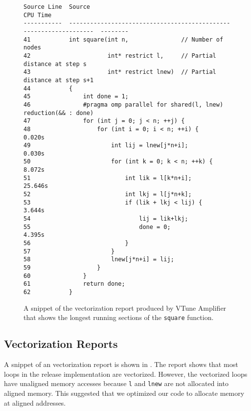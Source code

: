 \begin{figure}[h]
{
\scriptsize
\begin{BVerbatim}
Source Line  Source                                                              CPU Time
-----------  ------------------------------------------------------------------  --------
41           int square(int n,               // Number of nodes
42                      int* restrict l,     // Partial distance at step s
43                      int* restrict lnew)  // Partial distance at step s+1
44           {
45               int done = 1;
46               #pragma omp parallel for shared(l, lnew) reduction(&& : done)
47               for (int j = 0; j < n; ++j) {
48                   for (int i = 0; i < n; ++i) {                                 0.020s
49                       int lij = lnew[j*n+i];                                    0.030s
50                       for (int k = 0; k < n; ++k) {                             8.072s
51                           int lik = l[k*n+i];                                  25.646s
52                           int lkj = l[j*n+k];
53                           if (lik + lkj < lij) {                                3.644s
54                               lij = lik+lkj;
55                               done = 0;                                         4.395s
56                           }
57                       }
58                       lnew[j*n+i] = lij;
59                   }
60               }
61               return done;
62           }
\end{BVerbatim}
}
\caption{%
  A snippet of the vectorization report produced by VTune Amplifier that shows
  the longest running sections of the \texttt{square} function.
}
\label{fig:vtune-b}
\end{figure}

\subsection{Vectorization Reports}
A snippet of an \icc{} vectorization report is shown in
. The report shows that most loops in the release
implementation are vectorized. However, the vectorized loops have unaligned
memory accesses because \texttt{l} and \texttt{lnew} are not allocated into
aligned memory. This suggested that we optimized our code to allocate memory
at aligned addresses.

